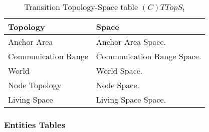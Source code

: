 \begin{table}[H]
	\centering
	\begin{tabular}{|p{4cm}|p{8cm}|}
			\hline
			\textbf{Topology} & \textbf{Space} \\
			\hline
			Anchor Area & Anchor Area Space.\\
			\hline
			Communication Range & Communication Range Space. \\
			\hline
			World & World Space. \\
			\hline
			Node Topology & Node Space. \\
			\hline
			Living Space & Living Space Space. \\
			\hline
		\end{tabular}
	\caption{Transition Topology-Space table $(C)TTopS_t$}
	\label{tab:cttopst}
\end{table}

\subsubsection{Entities Tables}

